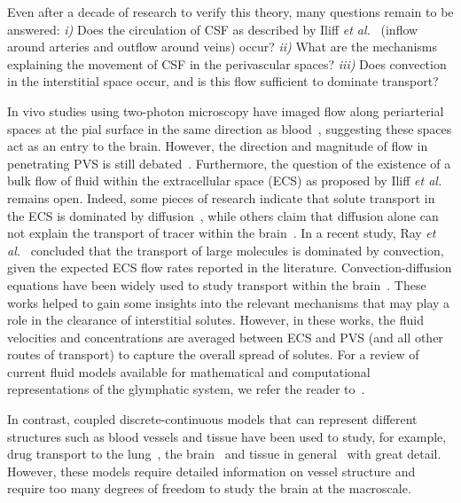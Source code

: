\documentclass[a4paper,11pt]{article}
\newcommand{\etal}{\emph{et al.}\;}
\newcommand{\1}{^{(1)}}
\newcommand{\2}{^{(2)}}
\begin{document}
Even after a decade of research to verify this theory, many questions remain to be answered:
\textit{i)} Does the circulation of CSF as described by Iliff \etal~\cite{Iliff_2012_PVS} (inflow around arteries and outflow around veins) occur? 
\textit{ii)} What are the mechanisms explaining the movement of CSF in the perivascular spaces?
\textit{iii)} Does convection in the interstitial space occur, and is this flow sufficient to dominate transport? 

In vivo studies using two-photon microscopy have imaged flow along periarterial spaces at the pial surface in the same direction as blood~\cite{bedussi-2018-paravascular,mestre_flow_2018}, suggesting these spaces act as an entry to the brain. However,  the direction and magnitude of flow in penetrating PVS is still debated~\cite{bakker2019paravascular}. Furthermore, the question of the existence of a bulk flow of fluid within the extracellular space (ECS) as proposed by Iliff \etal~\cite{Iliff_2012_PVS} remains open. Indeed, some pieces of research indicate that solute transport in the ECS is dominated by diffusion~\cite{asgari_glymphatic_2016, Holter9894, smith2019going}, while others claim that diffusion alone can not explain the transport of tracer within the brain~\cite{valnes_apparent_2020, ray2021quantitative,thomas2022theoretical}. In a recent study, Ray \etal~\cite{ray_analysis_2019} concluded that the transport of large molecules is dominated by convection, given the expected ECS flow rates reported in the literature. Convection-diffusion equations have been widely used to study transport within the brain~\cite{ray_analysis_2019,valnes_apparent_2020,Holter9894,nicholson-1981-ion, stoverud_modeling_2012, ray2021quantitative, croci2019uncertainty}. These works helped to gain some insights into the relevant mechanisms that may play a role in the clearance of interstitial solutes. However, in these works, the fluid velocities and concentrations are averaged between ECS and PVS (and all other routes of transport) to capture the overall spread of solutes. 
For a review of current fluid models available for mathematical and computational representations of the glymphatic system, we refer the reader to~\cite{kelley2023cerebrospinal}.

In contrast, coupled discrete-continuous models that can represent different structures such as blood vessels and tissue have been used to study, for example, drug transport to the lung~\cite{Erbertseder-2012-lung}, the brain~\cite{peyrounette_2018_multiscale} and tissue in general~\cite{Shipley_2019_hybrid} with great detail. However, these models require detailed information on vessel structure and require too many degrees of freedom to study the brain at the macroscale. 
\end{document}
